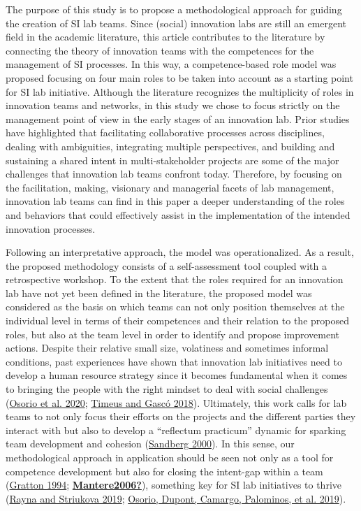 \documentclass[AMA,STIX1COL,APA,STIX2COL]{WileyNJD-v2}
\begin{document}
The purpose of this study is to propose a methodological approach for
guiding the creation of SI lab teams. Since (social) innovation labs are
still an emergent field in the academic literature, this article
contributes to the literature by connecting the theory of innovation
teams with the competences for the management of SI processes. In this
way, a competence-based role model was proposed focusing on four main
roles to be taken into account as a starting point for SI lab
initiative. Although the literature recognizes the multiplicity of roles
in innovation teams and networks, in this study we chose to focus
strictly on the management point of view in the early stages of an
innovation lab. Prior studies have highlighted that facilitating
collaborative processes across disciplines, dealing with ambiguities,
integrating multiple perspectives, and building and sustaining a shared
intent in multi-stakeholder projects are some of the major challenges
that innovation lab teams confront today. Therefore, by focusing on the
facilitation, making, visionary and managerial facets of lab management,
innovation lab teams can find in this paper a deeper understanding of
the roles and behaviors that could effectively assist in the
implementation of the intended innovation processes.

Following an interpretative approach, the model was operationalized. As
a result, the proposed methodology consists of a self-assessment tool
coupled with a retrospective workshop. To the extent that the roles
required for an innovation lab have not yet been defined in the
literature, the proposed model was considered as the basis on which
teams can not only position themselves at the individual level in terms
of their competences and their relation to the proposed roles, but also
at the team level in order to identify and propose improvement actions.
Despite their relative small size, volatiness and sometimes informal
conditions, past experiences have shown that innovation lab initiatives
need to develop a human resource strategy since it becomes fundamental
when it comes to bringing the people with the right mindset to deal with
social challenges (\protect\hyperlink{ref-Osorio2020}{Osorio et al.
2020}; \protect\hyperlink{ref-Timeus2018}{Timeus and Gascó 2018}).
Ultimately, this work calls for lab teams to not only focus their
efforts on the projects and the different parties they interact with but
also to develop a ``reflectum practicum'' dynamic for sparking team
development and cohesion (\protect\hyperlink{ref-Sandberg2000}{Sandberg
2000}). In this sense, our methodological approach in application should
be seen not only as a tool for competence development but also for
closing the intent-gap within a team
(\protect\hyperlink{ref-Gratton1994}{Gratton 1994};
\protect\hyperlink{ref-Mantere2006}{\textbf{Mantere2006?}}), something
key for SI lab initiatives to thrive
(\protect\hyperlink{ref-Rayna2019}{Rayna and Striukova 2019};
\protect\hyperlink{ref-Osorio2019}{Osorio, Dupont, Camargo, Palominos,
et al. 2019}).
\end{document}
